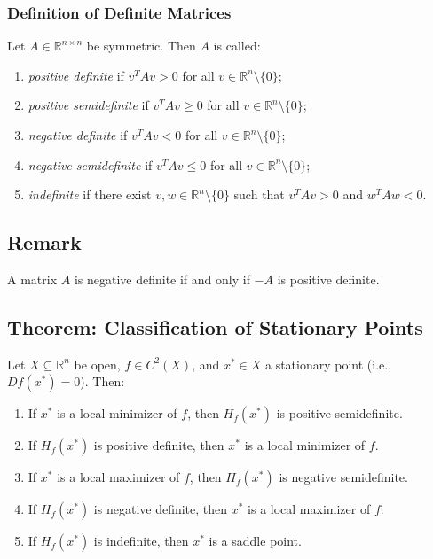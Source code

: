 \documentclass{article}
\begin{document}
\subsubsection{Definition of Definite Matrices}
Let \( A \in \mathbb{R}^{n \times n} \) be symmetric. Then \( A \) is called:
\begin{enumerate}
    \item \textit{positive definite} if \( v^T A v > 0 \) for all \( v \in \mathbb{R}^n \setminus \{0\} \);
    \item \textit{positive semidefinite} if \( v^T A v \geq 0 \) for all \( v \in \mathbb{R}^n \setminus \{0\} \);
    \item\textit{negative definite} if \( v^T A v < 0 \) for all \( v \in \mathbb{R}^n \setminus \{0\} \);
    \item \textit{negative semidefinite} if \( v^T A v \leq 0 \) for all \( v \in \mathbb{R}^n \setminus \{0\} \);
    \item \textit{indefinite} if there exist \( v, w \in \mathbb{R}^n \setminus \{0\} \) such that \( v^T A v > 0 \) and \( w^T A w < 0 \).
\end{enumerate}

\subsection*{Remark}
A matrix \( A \) is negative definite if and only if \( -A \) is positive definite.

\subsection*{Theorem: Classification of Stationary Points}
Let \( X \subseteq \mathbb{R}^n \) be open, \( f \in C^2(X) \), and \( x^* \in X \) a stationary point (i.e., \( Df(x^*) = 0 \)). Then:
\begin{enumerate}
    \item If \( x^* \) is a local minimizer of \( f \), then \( H_f(x^*) \) is positive semidefinite.
    \item If \( H_f(x^*) \) is positive definite, then \( x^* \) is a local minimizer of \( f \).
    \item If \( x^* \) is a local maximizer of \( f \), then \( H_f(x^*) \) is negative semidefinite.
    \item If \( H_f(x^*) \) is negative definite, then \( x^* \) is a local maximizer of \( f \).
    \item If \( H_f(x^*) \) is indefinite, then \( x^* \) is a saddle point.
\end{enumerate}
\end{document}
